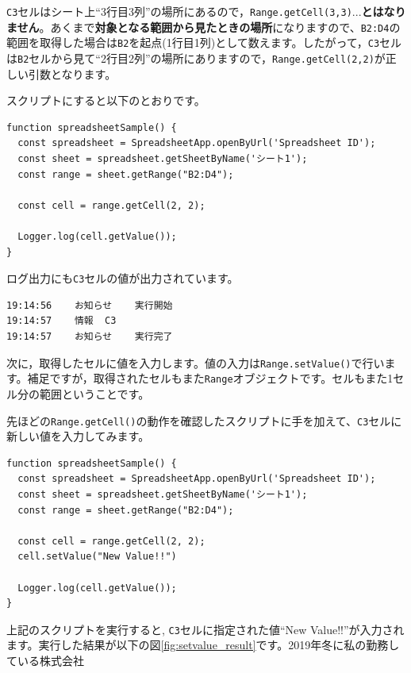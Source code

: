 \documentclass[uplatex,a4j]{jsarticle}
\begin{document}
\verb|C3|セルはシート上``3行目3列''の場所にあるので，\verb|Range.getCell(3,3)|...\textbf{とはなりません}。あくまで\textbf{対象となる範囲から見たときの場所}になりますので、\verb|B2:D4|の範囲を取得した場合は\verb|B2|を起点(1行目1列)として数えます。したがって，\verb|C3|セルは\verb|B2|セルから見て``2行目2列''の場所にありますので，\verb|Range.getCell(2,2)|が正しい引数となります。

スクリプトにすると以下のとおりです。

\begin{lstlisting}[basicstyle=\ttfamily\footnotesize,frame=single,caption=Range.getCellで特定のセルを取得する]
function spreadsheetSample() {
  const spreadsheet = SpreadsheetApp.openByUrl('Spreadsheet ID');
  const sheet = spreadsheet.getSheetByName('シート1');
  const range = sheet.getRange("B2:D4");

  const cell = range.getCell(2, 2);
  
  Logger.log(cell.getValue());
}
\end{lstlisting}

ログ出力にも\verb|C3|セルの値が出力されています。

\begin{lstlisting}[basicstyle=\ttfamily\footnotesize,frame=single,caption=Range.getCell実行ログ例]
19:14:56	お知らせ	実行開始
19:14:57	情報	C3
19:14:57	お知らせ	実行完了
\end{lstlisting}

次に，取得したセルに値を入力します。値の入力は\verb|Range.setValue()|で行います。補足ですが，取得されたセルもまた\verb|Range|オブジェクトです。セルもまた1セル分の範囲ということです。

先ほどの\verb|Range.getCell()|の動作を確認したスクリプトに手を加えて、\verb|C3|セルに新しい値を入力してみます。

\begin{lstlisting}[basicstyle=\ttfamily\footnotesize,frame=single,caption=Range.setValueで特定のセルに値を入力する]
function spreadsheetSample() {
  const spreadsheet = SpreadsheetApp.openByUrl('Spreadsheet ID');
  const sheet = spreadsheet.getSheetByName('シート1');
  const range = sheet.getRange("B2:D4");

  const cell = range.getCell(2, 2);
  cell.setValue("New Value!!")

  Logger.log(cell.getValue());
}
\end{lstlisting}

上記のスクリプトを実行すると, \verb|C3|セルに指定された値``New Value!!''が入力されます。実行した結果が以下の図\ref{fig:setvalue_result}です。2019年冬に私の勤務している株式会社
\end{document}
